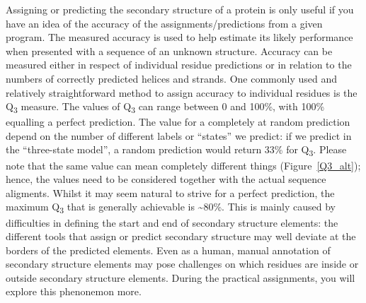 Assigning or predicting the secondary structure of a protein is only useful if you have an idea of the accuracy of the assignments/predictions from a given program.
The measured accuracy is used to help estimate its likely performance when presented with a sequence of an unknown structure.
Accuracy can be measured either in respect of individual residue predictions or in relation to the numbers of correctly predicted helices and strands.
One commonly used and relatively straightforward method to assign accuracy to individual residues is the Q\textsubscript{3} measure.
The values of Q\textsubscript{3} can range between 0 and 100\%, with 100\% equalling a perfect prediction.
The value for a completely at random prediction depend on the number of different labels or ``states'' we predict: if we predict in the ``three-state model'', a random prediction would return 33\% for Q\textsubscript{3}.
Please note that the same value can mean completely different things (Figure~\ref{Q3_alt}); hence, the values need to be considered together with the actual sequence aligments.
Whilst it may seem natural to strive for a perfect prediction, the maximum Q\textsubscript{3} that is generally achievable is {\textasciitilde}80\%.
This is mainly caused by difficulties in defining the start and end of secondary structure elements: the different tools that assign or predict secondary structure may well deviate at the borders of the predicted elements.
Even as a human, manual annotation of secondary structure elements may pose challenges on which residues are inside or outside secondary structure elements.
During the practical assignments, you will explore this phenonemon more.

% 

